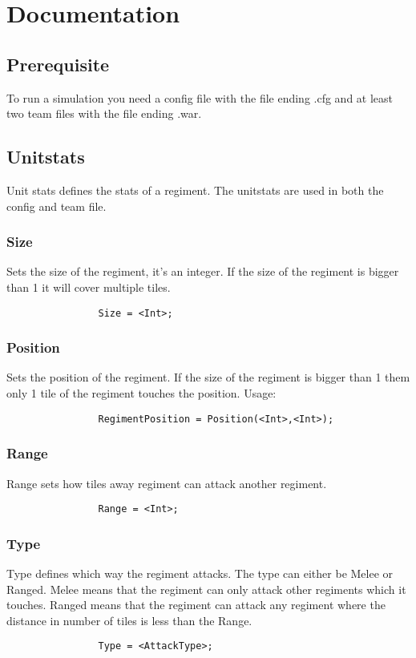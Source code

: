 \section{Documentation}
	\subsection{Prerequisite}
		To run a simulation you need a config file with the file ending .cfg and at least two team files
		with the file ending .war.
	\subsection{Unitstats}
	Unit stats defines the stats of a regiment. The unitstats are used in both the config and team file.
		\subsubsection{Size}
			Sets the size of the regiment, it's an integer.
			If the size of the regiment is bigger than 1 it will cover multiple tiles.
			\begin{verbatim}
				Size = <Int>;
			\end{verbatim}
		\subsubsection{Position}
			Sets the position of the regiment. If the size of the regiment is bigger than 1 them 
			only 1 tile of the regiment touches the position. Usage: 
			\begin{verbatim}
				RegimentPosition = Position(<Int>,<Int>);
			\end{verbatim}
		\subsubsection{Range}
			Range sets how tiles away regiment can attack another regiment.
			\begin{verbatim}
				Range = <Int>;
			\end{verbatim}
		\subsubsection{Type}
			Type defines which way the regiment attacks. The type can either be Melee or Ranged.
			Melee means that the regiment can only attack other regiments which it touches. Ranged means 
			that the regiment can attack any regiment where the distance in number of tiles is less than the Range.
			\begin{verbatim}
				Type = <AttackType>; 
			\end{verbatim}	
